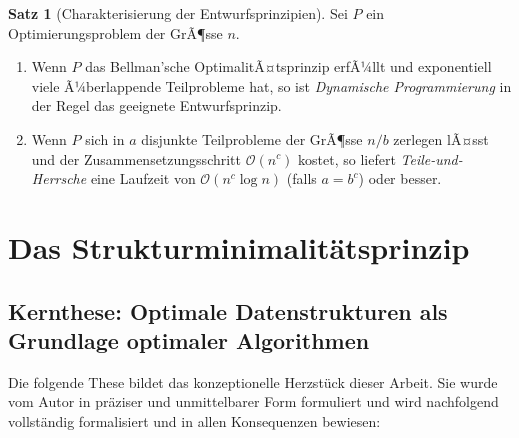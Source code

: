 ﻿\documentclass[a4paper,12pt]{article}
\theoremstyle{definition}
\newtheorem{satz}{Satz}
\begin{document}
\begin{satz}[Charakterisierung der Entwurfsprinzipien]
    \label{satz:paradigmen}
    Sei $P$ ein Optimierungsproblem der GrÃ¶sse $n$.
    \begin{enumerate}
        \item Wenn $P$ das Bellman'sche OptimalitÃ¤tsprinzip erfÃ¼llt und
              exponentiell viele Ã¼berlappende Teilprobleme hat, so ist
              \emph{Dynamische Programmierung} in der Regel das geeignete
              Entwurfsprinzip.
        \item Wenn $P$ sich in $a$ disjunkte Teilprobleme der GrÃ¶sse $n/b$
              zerlegen lÃ¤sst und der Zusammensetzungsschritt
              $\mathcal{O}(n^c)$ kostet, so liefert \emph{Teile-und-Herrsche}
              eine Laufzeit von $\mathcal{O}(n^c \log n)$ (falls $a = b^c$)
              oder besser.
    \end{enumerate}
\end{satz}

\section{Das Strukturminimalit\"{a}tsprinzip}

\subsection{Kernthese: Optimale Datenstrukturen als Grundlage optimaler Algorithmen}

Die folgende These bildet das konzeptionelle Herzst\"{u}ck dieser Arbeit.
Sie wurde vom Autor in pr\"{a}ziser und unmittelbarer Form formuliert und wird
nachfolgend vollst\"{a}ndig formalisiert und in allen Konsequenzen bewiesen:
\end{document}
